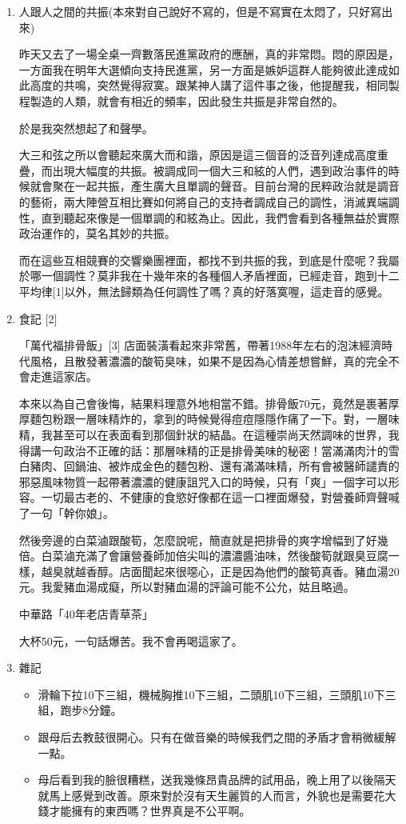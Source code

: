 \documentclass[a5paper, 12pt
]{book}
\providecommand{\tightlist}{%
  \setlength{\itemsep}{0pt}\setlength{\parskip}{0pt}}
\begin{document}
\begin{enumerate}
\def\labelenumi{\arabic{enumi}.}
\item
  人跟人之間的共振(本來對自己說好不寫的，但是不寫實在太悶了，只好寫出來)

  昨天又去了一場全桌一齊數落民進黨政府的應酬，真的非常悶。悶的原因是，一方面我在明年大選傾向支持民進黨，另一方面是嫉妒這群人能夠彼此達成如此高度的共鳴，突然覺得寂寞。跟某神人講了這件事之後，他提醒我，相同製程製造的人類，就會有相近的頻率，因此發生共振是非常自然的。

  於是我突然想起了和聲學。

  大三和弦之所以會聽起來廣大而和諧，原因是這三個音的泛音列達成高度重疊，而出現大幅度的共振。被調成同一個大三和絃的人們，遇到政治事件的時候就會聚在一起共振，產生廣大且單調的聲音。目前台灣的民粹政治就是調音的藝術，兩大陣營互相比賽如何將自己的支持者調成自己的調性，消滅異端調性，直到聽起來像是一個單調的和絃為止。因此，我們會看到各種無益於實際政治運作的，莫名其妙的共振。

  而在這些互相競賽的交響樂團裡面，都找不到共振的我，到底是什麼呢？我屬於哪一個調性？莫非我在十幾年來的各種個人矛盾裡面，已經走音，跑到十二平均律{[}1{]}以外，無法歸類為任何調性了嗎？真的好落寞喔，這走音的感覺。
\item
  食記 {[}2{]}

  「萬代福排骨飯」{[}3{]}
  店面裝潢看起來非常舊，帶著1988年左右的泡沫經濟時代風格，且散發著濃濃的酸筍臭味，如果不是因為心情差想嘗鮮，真的完全不會走進這家店。

  本來以為自己會後悔，結果料理意外地相當不錯。排骨飯70元，竟然是裹著厚厚麵包粉跟一層味精炸的，拿到的時候覺得痘痘隱隱作痛了一下。對，一層味精，我甚至可以在表面看到那個針狀的結晶。在這種崇尚天然調味的世界，我得講一句政治不正確的話：那層味精的正是排骨美味的秘密！當滿滿肉汁的雪白豬肉、回鍋油、被炸成金色的麵包粉、還有滿滿味精，所有會被醫師譴責的邪惡風味物質一起帶著濃濃的健康詛咒入口的時候，只有「爽」一個字可以形容。一切最古老的、不健康的食慾好像都在這一口裡面爆發，對營養師齊聲喊了一句「幹你娘」。

  然後旁邊的白菜滷跟酸筍，怎麼說呢，簡直就是把排骨的爽字增幅到了好幾倍。白菜滷充滿了會讓營養師加倍尖叫的濃濃醬油味，然後酸筍就跟臭豆腐一樣，越臭就越香醇。店面聞起來很噁心，正是因為他們的酸筍真香。豬血湯20元。我愛豬血湯成癡，所以對豬血湯的評論可能不公允，姑且略過。

  中華路「40年老店青草茶」

  大杯50元，一句話爆苦。我不會再喝這家了。
\item
  雜記

  \begin{itemize}
  \tightlist
  \item
    滑輪下拉10下三組，機械胸推10下三組，二頭肌10下三組，三頭肌10下三組，跑步8分鐘。
  \item
    跟母后去教鼓很開心。只有在做音樂的時候我們之間的矛盾才會稍微緩解一點。
  \item
    母后看到我的臉很糟糕，送我幾條昂貴品牌的試用品，晚上用了以後隔天就馬上感覺到改善。原來對於沒有天生麗質的人而言，外貌也是需要花大錢才能擁有的東西嗎？世界真是不公平啊。
  \end{itemize}
\end{enumerate}
\end{document}
